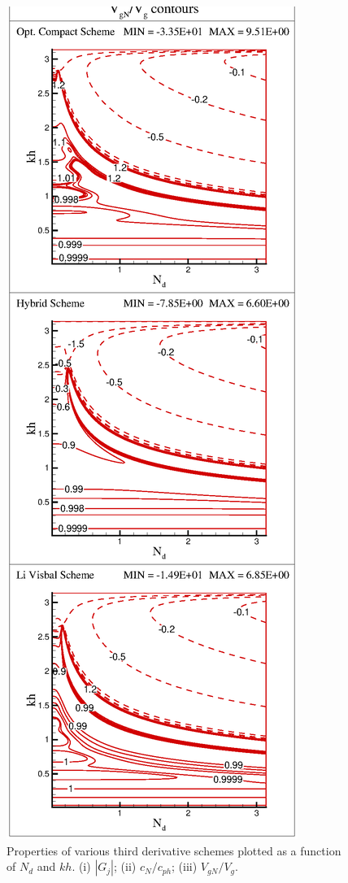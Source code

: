 \documentclass{svjour3}                    %
\begin{document}
\begin{figure}[h!]
\includegraphics[scale=0.380]{Fig_7c}
\caption{Properties of various third derivative schemes plotted as a function of $N_d$ and $kh$. (i) $|G_j|$; (ii) $c_N/c_{ph}$; (iii) $V_{gN}/V_g$. }
\label{fig:props}
\end{figure}
\end{document}
